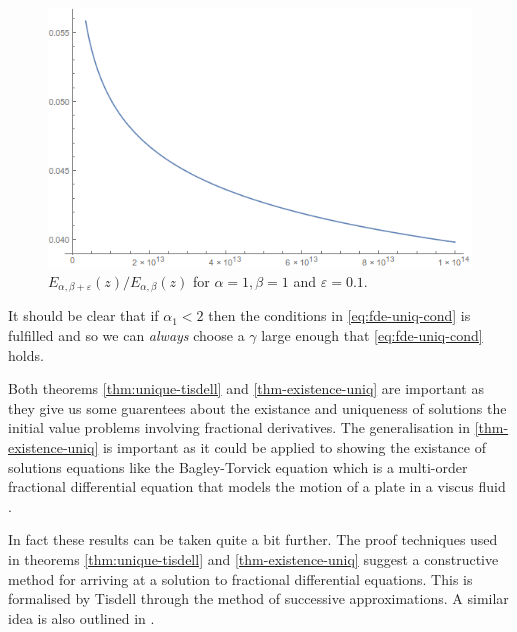 \begin{figure}[H]
\includegraphics[scale=0.6]{images/Mittag-Leffler-Quotient}
\caption{$ E_{\alpha, \beta + \varepsilon}(z) / E_{\alpha, \beta}(z) $ for $ \alpha = 1, \beta = 1 $ and $ \varepsilon = 0.1 $.}
\label{fig:mittag-quotient}
\end{figure}

It should be clear that if $ \alpha_1 < 2 $ then the conditions in \ref{eq:fde-uniq-cond} is fulfilled and so we can \emph{always} choose a $ \gamma $ large enough that \eqref{eq:fde-uniq-cond} holds.


Both theorems \ref{thm:unique-tisdell} and \ref{thm-existence-uniq} are important as they give us some guarentees about the existance and uniqueness of solutions the initial value problems involving fractional derivatives. The generalisation in \ref{thm-existence-uniq} is important as it could be applied to showing the existance of solutions equations like the Bagley-Torvick equation which is a multi-order fractional differential equation that models the motion of a plate in a viscus fluid \cite{Diethelm2002-3, Podlubny1999, Torvik1984}.

In fact these results can be taken quite a bit further. The proof techniques used in theorems \ref{thm:unique-tisdell} and \ref{thm-existence-uniq} suggest a constructive method for arriving at a solution to fractional differential equations. This is formalised by Tisdell \cite{Tisdell2012} through the method of successive approximations. A similar idea is also outlined in \cite{Podlubny1999}.

\clearpage

